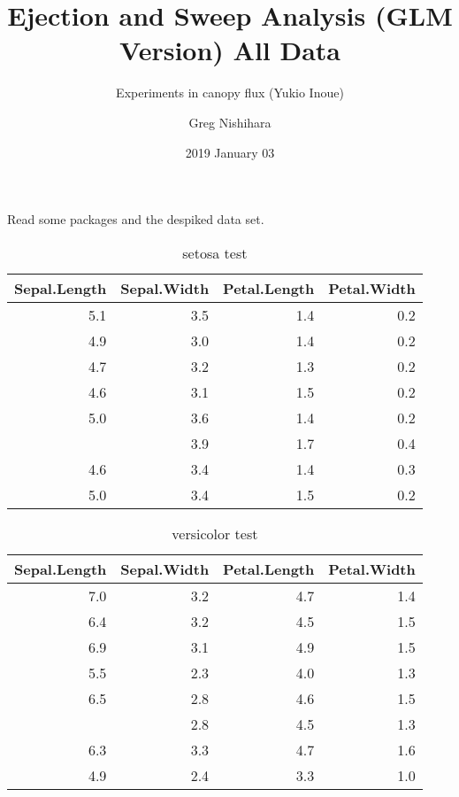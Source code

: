 \documentclass[10pt,]{article}
\title{Ejection and Sweep Analysis (GLM Version) All Data}
\subtitle{Experiments in canopy flux (Yukio Inoue)}
\author{Greg Nishihara}
\date{2019 January 03}
\begin{document}
\maketitle

{
\setcounter{tocdepth}{2}
\tableofcontents
}
Read some packages and the despiked data set.

\clearpage
\begin{table}

\caption{\label{tab:unnamed-chunk-1}setosa test}
\centering
\begin{tabular}[t]{rrrr}
\toprule
Sepal.Length & Sepal.Width & Petal.Length & Petal.Width\\
\midrule
5.1 & 3.5 & 1.4 & 0.2\\
4.9 & 3.0 & 1.4 & 0.2\\
4.7 & 3.2 & 1.3 & 0.2\\
4.6 & 3.1 & 1.5 & 0.2\\
5.0 & 3.6 & 1.4 & 0.2\\
\addlinespace
5.4 & 3.9 & 1.7 & 0.4\\
4.6 & 3.4 & 1.4 & 0.3\\
5.0 & 3.4 & 1.5 & 0.2\\
\bottomrule
\end{tabular}
\end{table}

\clearpage
\begin{table}

\caption{\label{tab:unnamed-chunk-1}versicolor test}
\centering
\begin{tabular}[t]{rrrr}
\toprule
Sepal.Length & Sepal.Width & Petal.Length & Petal.Width\\
\midrule
7.0 & 3.2 & 4.7 & 1.4\\
6.4 & 3.2 & 4.5 & 1.5\\
6.9 & 3.1 & 4.9 & 1.5\\
5.5 & 2.3 & 4.0 & 1.3\\
6.5 & 2.8 & 4.6 & 1.5\\
\addlinespace
5.7 & 2.8 & 4.5 & 1.3\\
6.3 & 3.3 & 4.7 & 1.6\\
4.9 & 2.4 & 3.3 & 1.0\\
\bottomrule
\end{tabular}
\end{table}
\end{document}
